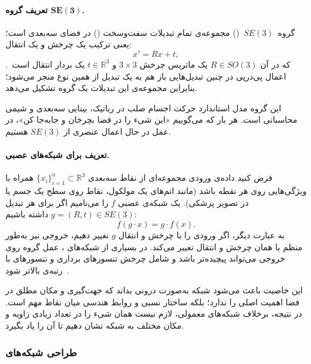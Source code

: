 \documentclass{article}
\begin{document}
\paragraph{تعریف گروه \(\boldsymbol{SE(3)}\).}

گروه \(\,SE(3)\,\) () مجموعه‌ی تمام تبدیلات سفت‌و‌سخت () در فضای سه‌بعدی است؛ یعنی ترکیب یک چرخش و یک انتقال:
\begin{equation}
	x' = R x + t,
\end{equation}
که در آن \(R \in SO(3)\) یک ماتریس چرخش \(3 \times 3\) و \(t \in \mathbb{R}^3\) یک بردار انتقال است~\cite{bronstein2021geometric}. اعمال پی‌درپی در چنین تبدیل‌هایی باز هم به یک تبدیل از همین نوع منجر می‌شود؛ بنابراین مجموعه‌ی این تبدیلات یک گروه تشکیل می‌دهد.

این گروه مدل استاندارد حرکت اجسام صلب در رباتیک، بینایی سه‌بعدی و شیمی محاسباتی است. هر بار که می‌گوییم «این شیء را در فضا بچرخان و جابه‌جا کن»، در عمل در حال اعمال عنصری از \(SE(3)\) هستیم.

\paragraph{تعریف  برای شبکه‌های عصبی.}

فرض کنید داده‌ی ورودی مجموعه‌ای از نقاط سه‌بعدی \(\{x_i\}_{i=1}^n \subset \mathbb{R}^3\) همراه با ویژگی‌هایی روی هر نقطه باشد (مانند اتم‌های یک مولکول، نقاط روی سطح یک جسم یا  در تصویر پزشکی). یک شبکه‌ی عصبی \(f\) را  می‌نامیم اگر برای هر تبدیل \(g = (R,t) \in SE(3)\) داشته باشیم:
\begin{equation}
	f(g \cdot x) = g \cdot f(x).
\end{equation}
به عبارت دیگر، اگر ورودی را با چرخش و انتقال \(g\) تغییر دهیم، خروجی نیز به‌طور منظم با همان چرخش و انتقال تغییر می‌کند. در بسیاری از شبکه‌های ، عمل گروه روی خروجی می‌تواند پیچیده‌تر باشد و شامل چرخش تنسورهای برداری و تنسورهای با رتبه‌ی بالاتر شود~\cite{thomas2018tensor,fuchs2020se,satorras2021en}.

این خاصیت باعث می‌شود شبکه به‌صورت درونی بداند که جهت‌گیری و مکان مطلق در فضا اهمیت اصلی را ندارد؛ بلکه ساختار نسبی و روابط هندسی میان نقاط مهم است. در نتیجه، برخلاف شبکه‌های معمولی، لازم نیست همان شیء را در تعداد زیادی زاویه و مکان مختلف به شبکه نشان دهیم تا آن را یاد بگیرد.



\subsubsection{طراحی شبکه‌های }
\end{document}
